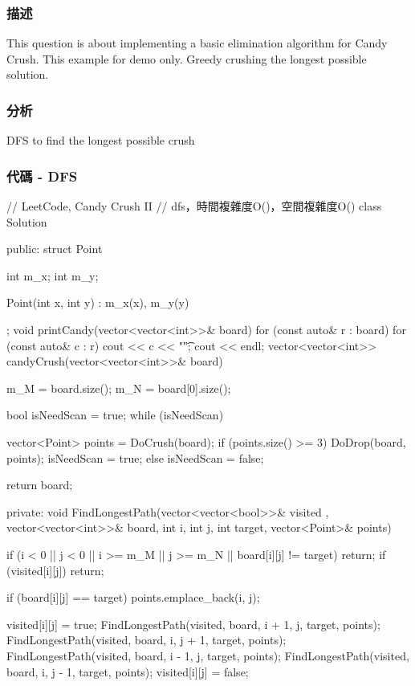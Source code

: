 \subsubsection{描述}
This question is about implementing a basic elimination algorithm for Candy Crush. This example for demo only. Greedy crushing the longest possible solution.

\subsubsection{分析}
DFS to find the longest possible crush

\subsubsection{代碼 - DFS}
\begin{Code}
// LeetCode, Candy Crush II
// dfs，時間複雜度O()，空間複雜度O()
class Solution {
public:
    struct Point
    {
        int m_x;
        int m_y;

        Point(int x, int y) : m_x(x), m_y(y) {}
    };
    void printCandy(vector<vector<int>>& board) {
        for (const auto& r : board)
        {
            for (const auto& c : r)
                cout << c << "\t";
            cout << endl;
        }
    }
    vector<vector<int>> candyCrush(vector<vector<int>>& board) {
        m_M = board.size();
        m_N = board[0].size();

        bool isNeedScan = true;
        while (isNeedScan)
        {
            vector<Point> points = DoCrush(board);
            if (points.size() >= 3)
            {
                DoDrop(board, points);
                isNeedScan = true;
            }
            else
                isNeedScan = false;

        }
        return board;
    }
private:
    void FindLongestPath(vector<vector<bool>>& visited
      , vector<vector<int>>& board, int i, int j, int target, vector<Point>& points)
    {
        if (i < 0 || j < 0 || i >= m_M || j >= m_N || board[i][j] != target) return;
        if (visited[i][j]) return;

        if (board[i][j] == target)
            points.emplace_back(i, j);

        visited[i][j] = true;
        FindLongestPath(visited, board, i + 1, j, target, points);
        FindLongestPath(visited, board, i, j + 1, target, points);
        FindLongestPath(visited, board, i - 1, j, target, points);
        FindLongestPath(visited, board, i, j - 1, target, points);
        visited[i][j] = false;

}}
\end{Code}
